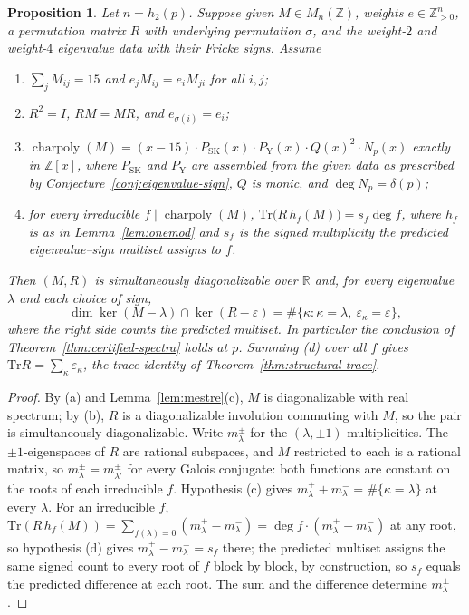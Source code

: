 \documentclass[11pt]{amsart}
\theoremstyle{plain}
\newtheorem{proposition}[theorem]{Proposition}
\theoremstyle{definition}
\newcommand{\Z}{\mathbb{Z}}
\newcommand{\R}{\mathbb{R}}
\newcommand{\Tr}{\mathrm{Tr}}
\newcommand{\eps}{\varepsilon}
\DeclareMathOperator{\charp}{charpoly}
\providecommand{\charp}{\operatorname{charpoly}}
\begin{document}
	\begin{proposition}	\label{prop:reduction}
		Let $n=h_2(p)$. Suppose given $M\in M_n(\Z)$, weights $e\in\Z_{>0}^n$, a
		permutation matrix $R$ with underlying permutation $\sigma$, and the
		weight-$2$ and weight-$4$ eigenvalue data with their Fricke signs. Assume
		\begin{enumerate}[label=\textup{(\alph*)},leftmargin=2.4em]
			\item $\sum_jM_{ij}=15$ and $e_jM_{ij}=e_iM_{ji}$ for all $i,j$;
			\item $R^2=I$, $RM=MR$, and $e_{\sigma(i)}=e_i$;
			\item $\charp(M)=(x-15)\cdot P_{\mathrm{SK}}(x)\cdot
			P_{\mathrm{Y}}(x)\cdot Q(x)^2\cdot N_p(x)$ exactly in $\Z[x]$, where
			$P_{\mathrm{SK}}$ and $P_{\mathrm{Y}}$ are assembled from the given data
			as prescribed by Conjecture~\ref{conj:eigenvalue-sign}, $Q$ is monic, and
			$\deg N_p=\delta(p)$;
			\item for every irreducible $f\mid\charp(M)$,
			$\Tr\bigl(R\,h_f(M)\bigr)=s_f\deg f$, where $h_f$ is as in
			Lemma~\ref{lem:onemod} and $s_f$ is the signed multiplicity the predicted
			eigenvalue--sign multiset assigns to $f$.
		\end{enumerate}
		Then $(M,R)$ is simultaneously diagonalizable over $\R$ and, for every
		eigenvalue $\lambda$ and each choice of sign,
		\[
		\dim\ker(M-\lambda)\cap\ker(R-\eps)
		=\#\{\kappa:\kappa=\lambda,\ \eps_\kappa=\eps\},
		\]
		where the right side counts the predicted multiset. In particular the
		conclusion of Theorem~\ref{thm:certified-spectra} holds at $p$. Summing
		\textup{(d)} over all $f$ gives $\Tr R=\sum_\kappa\eps_\kappa$, the trace
		identity of Theorem~\ref{thm:structural-trace}.
	\end{proposition}
	
	\begin{proof}
		By \textup{(a)} and Lemma~\ref{lem:mestre}(c), $M$ is diagonalizable with
		real spectrum; by \textup{(b)}, $R$ is a diagonalizable involution
		commuting with $M$, so the pair is simultaneously diagonalizable. Write
		$m_\lambda^\pm$ for the $(\lambda,\pm1)$-multiplicities. The
		$\pm1$-eigenspaces of $R$ are rational subspaces, and $M$ restricted to
		each is a rational matrix, so $m_\lambda^\pm=m_{\lambda'}^\pm$ for every
		Galois conjugate: both functions are constant on the roots of each
		irreducible $f$. Hypothesis \textup{(c)} gives
		$m_\lambda^++m_\lambda^-=\#\{\kappa=\lambda\}$ at every $\lambda$. For an
		irreducible $f$, $\Tr(R\,h_f(M))=\sum_{f(\lambda)=0}(m_\lambda^+-m_\lambda^-)
		=\deg f\cdot(m_\lambda^+-m_\lambda^-)$ at any root, so hypothesis
		\textup{(d)} gives $m_\lambda^+-m_\lambda^-=s_f$ there; the predicted
		multiset assigns the same signed count to every root of $f$ block by
		block, by construction, so $s_f$ equals the predicted difference at each
		root. The sum and the difference determine $m_\lambda^\pm$.
	\end{proof}
	
\end{document}
